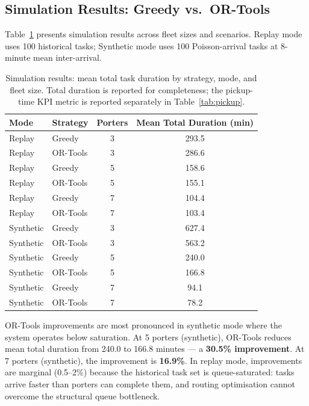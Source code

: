 \documentclass[12pt,a4paper]{article}
\begin{document}
\subsection{Simulation Results: Greedy vs.\ OR-Tools}
\label{sec:simresults}

Table~\ref{tab:sim_results} presents simulation results across fleet sizes and scenarios. Replay mode uses 100 historical tasks; Synthetic mode uses 100 Poisson-arrival tasks at 8-minute mean inter-arrival.

\begin{table}[H]
\centering
\caption{Simulation results: mean total task duration by strategy, mode, and fleet size. Total duration is reported for completeness; the pickup-time KPI metric is reported separately in Table~\ref{tab:pickup}.}
\label{tab:sim_results}
\vspace{4pt}
\begin{tabular}{llcc}
\toprule
\textbf{Mode} & \textbf{Strategy} & \textbf{Porters} & \textbf{Mean Total Duration (min)} \\
\midrule
Replay & Greedy   & 3 & 293.5 \\
Replay & OR-Tools & 3 & 286.6 \\
Replay & Greedy   & 5 & 158.6 \\
Replay & OR-Tools & 5 & 155.1 \\
Replay & Greedy   & 7 & 104.4 \\
Replay & OR-Tools & 7 & 103.4 \\
\midrule
Synthetic & Greedy   & 3 & 627.4 \\
Synthetic & OR-Tools & 3 & 563.2 \\
Synthetic & Greedy   & 5 & 240.0 \\
Synthetic & OR-Tools & 5 & 166.8 \\
Synthetic & Greedy   & 7 & 94.1  \\
Synthetic & OR-Tools & 7 & 78.2  \\
\bottomrule
\end{tabular}
\end{table}

OR-Tools improvements are most pronounced in synthetic mode where the system operates below saturation. At 5 porters (synthetic), OR-Tools reduces mean total duration from 240.0 to 166.8 minutes --- a \textbf{30.5\% improvement}. At 7 porters (synthetic), the improvement is \textbf{16.9\%}. In replay mode, improvements are marginal (0.5--2\%) because the historical task set is queue-saturated: tasks arrive faster than porters can complete them, and routing optimisation cannot overcome the structural queue bottleneck.
\end{document}
